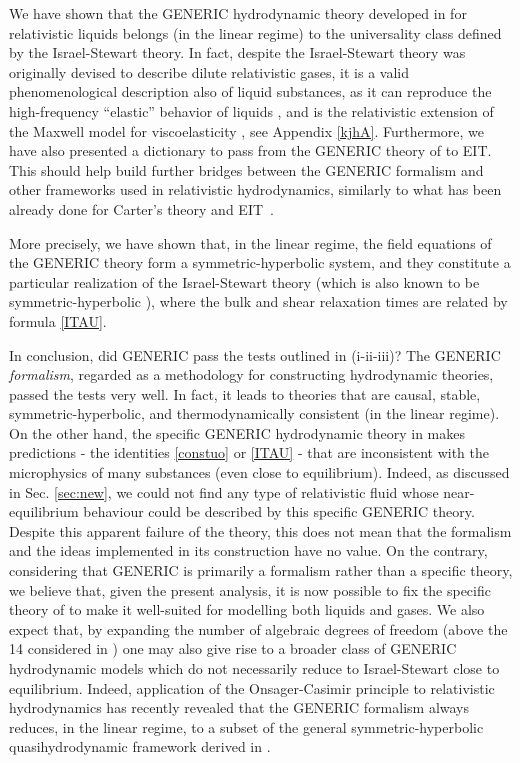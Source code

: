 \documentclass[a4paper, amsfonts, amssymb, amsmath, reprint, showkeys, nofootinbib, twoside, onecolumn, notitlepage]{revtex4-1}
\theoremstyle{definition}
\theoremstyle{theorem}
\begin{document}
We have shown that the GENERIC hydrodynamic theory developed in \citep{Stricker2019} for relativistic liquids belongs (in the linear regime) to the universality class defined by the Israel-Stewart theory. In fact, despite the Israel-Stewart theory was originally devised to describe dilute relativistic gases, it is a valid phenomenological description also of liquid substances, as it can reproduce the high-frequency ``elastic'' behavior of liquids \citep{Frenkel_book}, and is the relativistic extension of the Maxwell model for viscoelasticity \citep{Nettleton1959},  see Appendix \ref{kjhA}. Furthermore, we have also presented a dictionary to pass from the GENERIC theory of \cite{Stricker2019} to EIT. 
This should help build further bridges between the GENERIC formalism and other frameworks used in relativistic hydrodynamics, similarly to what has been already done for Carter's theory and EIT~\citep{GavassinoFronntiers2021,GavassinoKhalatnikov2022}.

More precisely, we have shown that, in the linear regime, the field equations of the GENERIC theory form a symmetric-hyperbolic system, and they constitute a particular realization of the Israel-Stewart theory (which is also known to be symmetric-hyperbolic \cite{Hishcock1983}), where the bulk and shear relaxation times are related by formula \eqref{ITAU}. 

In conclusion, did GENERIC pass the tests outlined in (i-ii-iii)? The GENERIC \textit{formalism}, regarded as a methodology for constructing hydrodynamic theories, passed the tests very well. In fact, it leads to theories that are causal, stable, symmetric-hyperbolic, and thermodynamically consistent (in the linear regime). 
On the other hand, the specific GENERIC hydrodynamic theory in \citep{Stricker2019} makes predictions - the identities \eqref{constuo} or \eqref{ITAU} - that are inconsistent with the microphysics of many substances (even close to equilibrium).
Indeed, as discussed in Sec. \ref{sec:new}, we could not find any type of relativistic fluid whose near-equilibrium behaviour could be described by this specific GENERIC theory. 
%
Despite this apparent failure of the theory, this does not mean that the formalism and the ideas implemented in its construction have no value.  
On the contrary, considering that GENERIC is primarily a formalism \cite{Grmela1997,OttingerReview2018} rather than a specific theory, we believe that, given the present analysis, it is now possible to fix the specific theory of \citet{Stricker2019} to make it well-suited for modelling both liquids and gases.  
We also expect that, by expanding the number of algebraic degrees of freedom (above the 14 considered in \cite{Stricker2019}) one may also give rise to a broader class of GENERIC hydrodynamic models which do not necessarily reduce to  Israel-Stewart close to equilibrium. Indeed, application of the Onsager-Casimir principle to relativistic hydrodynamics has recently revealed \cite{GavassinoCasimir2022} that the GENERIC formalism always reduces, in the linear regime, to a subset of the general symmetric-hyperbolic quasihydrodynamic framework derived in \cite{GavassinoQuasi2022}.  
\end{document}
